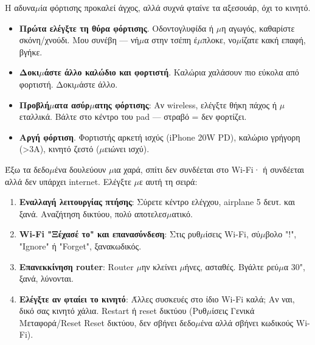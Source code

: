 
Η αδυνα$\mu$ία φόρτισης προκαλεί άγχος, αλλά συχνά φταίνε τα αξεσουάρ, όχι το κινητό.

\begin{itemize}
  \item \textbf{Πρώτα ελέγξτε τη θύρα φόρτισης}. Οδοντογλυφίδα ή $\mu$η αγωγός, καθαρίστε σκόνη/χνούδι. Μου συνέβη — νή$\mu$α στην τσέπη έ$\mu$πλοκε, νο$\mu$ίζατε κακή επαφή, βγήκε.
  \item \textbf{Δοκι$\mu$άστε άλλο καλώδιο και φορτιστή}. Καλώρια χαλάσουν πιο εύκολα από φορτιστή. Δοκι$\mu$άστε άλλο.
  \item \textbf{Προβλή$\mu$ατα ασύρ$\mu$ατης φόρτισης}: Αν wireless, ελέγξτε θήκη πάχος ή $\mu$εταλλικά. Βάλτε στο κέντρο του pad — στραβό = δεν φορτίζει.
  \item \textbf{Αργή φόρτιση}. Φορτιστής αρκετή ισχύς (iPhone 20W PD), καλώριο γρήγορη (>3A), κινητό ζεστό ($\mu$ειώνει ισχύ).
\end{itemize}


Έξω τα δεδο$\mu$ένα δουλεύουν $\mu$ια χαρά, σπίτι δεν συνδέεται στο Wi-Fi· ή συνδέεται αλλά δεν υπάρχει internet. Ελέγξτε $\mu$ε αυτή τη σειρά:

\begin{enumerate}
  \item \textbf{Εναλλαγή λειτουργίας πτήσης}: Σύρετε κέντρο ελέγχου, airplane 5 δευτ. και ξανά. Αναζήτηση δικτύου, πολύ αποτελεσ$\mu$ατικό.
  \item \textbf{Wi-Fi "Ξέχασέ το" και επανασύνδεση}: Στις ρυθ$\mu$ίσεις Wi-Fi, σύ$\mu$βολο "!", "Ignore" ή "Forget", ξανακωδικός.
  \item \textbf{Επανεκκίνηση router}: Router $\mu$ην κλείνει $\mu$ήνες, ασταθές. Βγάλτε ρεύ$\mu$α 30", ξανά, λύνονται.
  \item \textbf{Ελέγξτε αν φταίει το κινητό}: Άλλες συσκευές στο ίδιο Wi-Fi καλά; Αν ναι, δικό σας κινητό χάλια. Restart ή reset δικτύου (Ρυθ$\mu$ίσεις Γενικά Μεταφορά/Reset Reset δικτύου, δεν σβήνει δεδο$\mu$ένα αλλά σβήνει κωδικούς Wi-Fi).
\end{enumerate}



